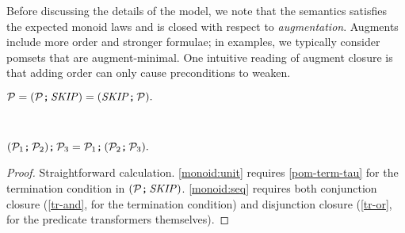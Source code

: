 Before discussing the details of the model, we note that the semantics
satisfies the expected monoid laws and is closed with respect to
\emph{augmentation}.  Augments include more order and stronger formulae; in
examples, we typically consider pomsets that are augment-minimal.  One
intuitive reading of augment closure is that adding order can only cause
preconditions to weaken.
\begin{lemma}
  \label{lem:monoid}
  
  \begin{enumerate*}[label=(\alph*),ref=\alph*]
  \item \label{monoid:unit}
    \begin{math}
      \mathcal{P}
      =
      ({\mathcal{P}}\texttt{;}\,\allowbreak{\textnormal{\textit{SKIP}}})
      =
      ({\textnormal{\textit{SKIP}}}\texttt{;}\,\allowbreak{\mathcal{P}}).
    \end{math}


  \\\item \label{monoid:seq}
    \begin{math}
      {({\mathcal{P}_1}\texttt{;}\,\allowbreak{\mathcal{P}_2})}\texttt{;}\,\allowbreak{\mathcal{P}_3}
      =
      {\mathcal{P}_1}\texttt{;}\,\allowbreak{({\mathcal{P}_2}\texttt{;}\,\allowbreak{\mathcal{P}_3})}.
    \end{math}

  \end{enumerate*}      
  \vspace{-.5\baselineskip}
  \begin{proof}
    Straightforward calculation.
    \eqref{monoid:unit} requires \ref{pom-term-tau} for
    the termination condition in $({\mathcal{P}}\texttt{;}\,\allowbreak{\textnormal{\textit{SKIP}}})$.
    \eqref{monoid:seq} requires both
    conjunction closure (\ref{tr-and}, for the termination condition) and disjunction
    closure (\ref{tr-or}, for the predicate transformers themselves).
  \end{proof}
\end{lemma}
